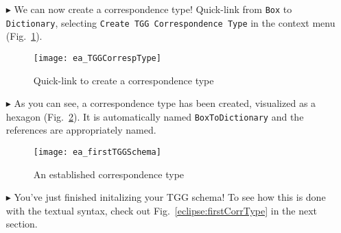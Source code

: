 \begin{itemize}
\vspace{0.5cm}

\item[$\blacktriangleright$] We can now create a correspondence type! Quick-link from \texttt{Box} to \texttt{Dictionary}, selecting \texttt{Create TGG
Corres\-pon\-dence Type} in the context menu (Fig.~\ref{ea:create_correspondence}).

\newpage

\begin{figure}[htbp]
\begin{center}
  \texttt{[image: ea\_TGGCorrespType]}
  \caption{Quick-link to create a correspondence type} 
  \label{ea:create_correspondence}
\end{center}
\end{figure}

\item[$\blacktriangleright$] As you can see, a correspondence type has been created, visualized as a hexagon (Fig.~\ref{ea:firstCorrType}). It is automatically
named \texttt{BoxToDiction\-ary} and the references are appropriately named.

\vspace{0.5cm}

\begin{figure}[htbp]
\begin{center}
  \texttt{[image: ea\_firstTGGSchema]}
  \caption{An established correspondence type} 
  \label{ea:firstCorrType}
\end{center}
\end{figure}

\vspace{0.5cm}

\item[$\blacktriangleright$] You've just finished initalizing your TGG schema! To see how this is done with the textual syntax, check out
Fig.~\ref{eclipse:firstCorrType} in the next section.




\end{itemize}

